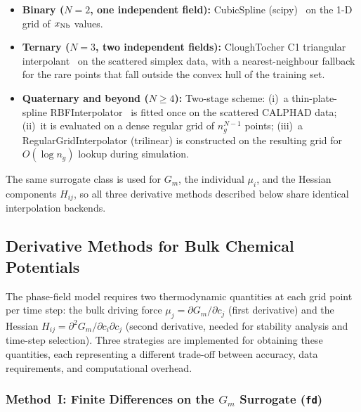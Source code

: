 \begin{itemize}
  \item \textbf{Binary ($N=2$, one independent field):}
        CubicSpline (scipy)~\cite{scipy} on the 1-D grid of
        $x_{\rm Nb}$ values.
  \item \textbf{Ternary ($N=3$, two independent fields):}
        CloughTocher C1 triangular interpolant~\cite{clough_tocher}
        on the scattered simplex data, with a nearest-neighbour
        fallback for the rare points that fall outside the convex
        hull of the training set.
  \item \textbf{Quaternary and beyond ($N \geq 4$):}
        Two-stage scheme: (i)~a thin-plate-spline
        RBFInterpolator~\cite{rbf_tps} is fitted once on the
        scattered CALPHAD data; (ii)~it is evaluated on a dense
        regular grid of $n_g^{N-1}$ points; (iii)~a
        RegularGridInterpolator (trilinear) is constructed on the
        resulting grid for $O(\log n_g)$ lookup during simulation.
\end{itemize}
The same surrogate class is used for $G_m$, the individual $\mu_i$,
and the Hessian components $H_{ij}$, so all three derivative methods
described below share identical interpolation backends.

\subsection{Derivative Methods for Bulk Chemical Potentials}
\label{sec:deriv_methods}

The phase-field model requires two thermodynamic quantities at each
grid point per time step: the bulk driving force
$\mu_j = \partial G_m/\partial c_j$ (first derivative) and the
Hessian $H_{ij} = \partial^2 G_m/\partial c_i\partial c_j$ (second
derivative, needed for stability analysis and time-step selection).
Three strategies are implemented for obtaining these quantities,
each representing a different trade-off between accuracy, data
requirements, and computational overhead.

\subsubsection{Method~I: Finite Differences on the $G_m$ Surrogate (\texttt{fd})}
\label{sec:fd}

